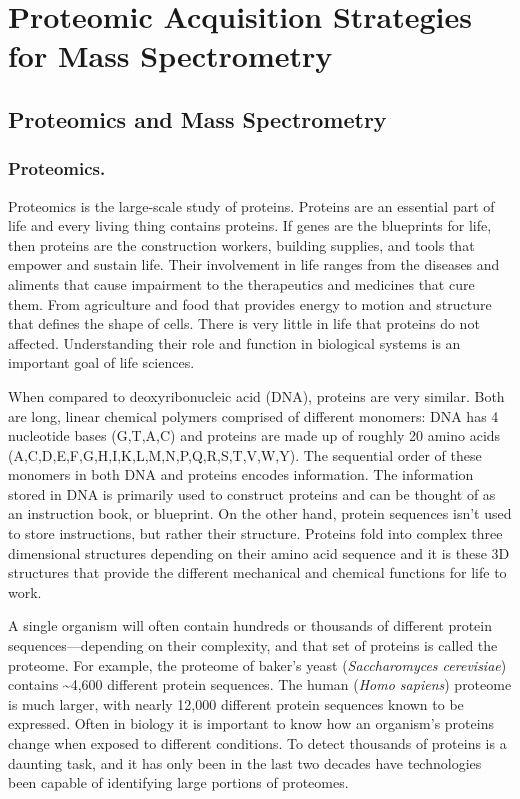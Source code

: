 \chapter{Proteomic Acquisition Strategies for Mass Spectrometry}

\section{Proteomics and Mass Spectrometry}

\subsection{Proteomics.}
Proteomics is the large-scale study of proteins. Proteins are an essential part of life and every living thing contains proteins. If genes are the blueprints for life, then proteins are the construction workers, building supplies, and tools that empower and sustain life. Their involvement in life ranges from the diseases and aliments that cause impairment to the therapeutics and medicines that cure them. From agriculture and food that provides energy to motion and structure that defines the shape of cells. There is very little in life that proteins do not affected. Understanding their role and function in biological systems is an important goal of life sciences. 

When compared to deoxyribonucleic acid (DNA), proteins are very similar. Both are long, linear chemical polymers comprised of different monomers: DNA has 4 nucleotide bases (G,T,A,C) and proteins are made up of roughly 20 amino acids (A,C,D,E,F,G,H,I,K,L,M,N,P,Q,R,S,T,V,W,Y). The sequential order of these monomers in both DNA and proteins encodes information. The information stored in DNA is primarily used to construct proteins and can be thought of as an instruction book, or blueprint. On the other hand, protein sequences isn't used to store instructions, but rather their structure. Proteins fold into complex three dimensional structures depending on their amino acid sequence and it is these 3D structures that provide the different mechanical and chemical functions for life to work.

A single organism will often contain hundreds or thousands of different protein sequences---depending on their complexity, and that set of proteins is called the proteome. For example, the proteome of baker's yeast (\emph{Saccharomyces cerevisiae}) contains \textasciitilde4,600 different protein sequences. The human (\emph{Homo sapiens}) proteome is much larger, with nearly 12,000 different protein sequences known to be expressed. Often in biology it is important to know how an organism's proteins change when exposed to different conditions. To detect thousands of proteins is a daunting task, and it has only been in the last two decades have technologies been capable of identifying large portions of proteomes. 


